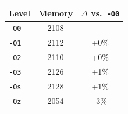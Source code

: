 \begin{tabular*}{\columnwidth}{@{\extracolsep\fill}lcc@{\extracolsep\fill}}
\toprule
\textbf{Level} & \textbf{Memory} & \textbf{$\Delta$ vs.\ \texttt{-O0}} \\
\midrule
\texttt{-O0} & 2108 & -- \\
\texttt{-O1} & 2112 & +0\% \\
\texttt{-O2} & 2110 & +0\% \\
\texttt{-O3} & 2126 & +1\% \\
\texttt{-Os} & 2128 & +1\% \\
\texttt{-Oz} & 2054 & -3\% \\
\bottomrule
\end{tabular*}
